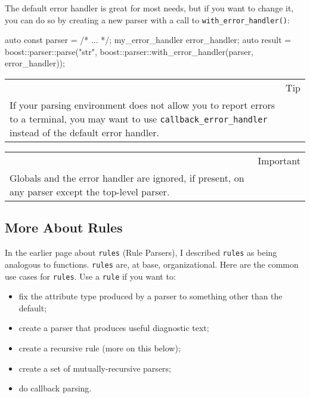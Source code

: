 The default error handler is great for most needs, but if you want to change it, you can do so by creating a new parser with a call to \texttt{with\_error\_handler()}:

\begin{code}
auto const parser = /* ... */;
my_error_handler error_handler;
auto result = boost::parser::parse("str", boost::parser::with_error_handler(parser, error_handler));
\end{code}

\begin{longtable}[]{@{}
  >{\raggedright\arraybackslash}p{}
  >{\raggedright\arraybackslash}p{}@{}}
\toprule\noalign{}
\endhead
\bottomrule\noalign{}
\endlastfoot
\begin{minipage}[t]{\linewidth}\raggedright
\end{minipage} & Tip \\
If your parsing environment does not allow you to report errors to a terminal, you may want to use \texttt{callback\_error\_handler} instead of the default error handler. & \\
\end{longtable}

\begin{longtable}[]{@{}
  >{\raggedright\arraybackslash}p{}
  >{\raggedright\arraybackslash}p{}@{}}
\toprule\noalign{}
\endhead
\bottomrule\noalign{}
\endlastfoot
\begin{minipage}[t]{\linewidth}\raggedright
\end{minipage} & Important \\
Globals and the error handler are ignored, if present, on any parser except the top-level parser. & \\
\end{longtable}

\subsection{More About Rules}

In the earlier page about \texttt{rules} (Rule Parsers), I described \texttt{rules} as being analogous to functions. \texttt{rules} are, at base, organizational. Here are the common use cases for \texttt{rules}. Use a \texttt{rule} if you want to:

\begin{itemize}
\item
  fix the attribute type produced by a parser to something other than the default;
\item
  create a parser that produces useful diagnostic text;
\item
  create a recursive rule (more on this below);
\item
  create a set of mutually-recursive parsers;
\item
  do callback parsing.
\end{itemize}

